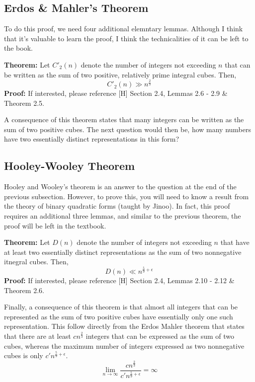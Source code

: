 \documentclass[8pt]{extarticle}
\begin{document}
\subsection{Erdos \& Mahler's Theorem}
To do this proof, we need four additional elemntary lemmas. Although I think that it's valuable to learn the proof, I think the technicalities of it can be left to the book.
\begin{boxedsection}
\textbf{Theorem:} Let $C'_2(n)$ denote the number of integers not exceeding $n$ that can be written as the sum of two positive, relatively prime integral cubes. Then, 
$$
C'_2(n) \gg n^{\frac{2}{3}}
$$
\textbf{Proof:} If interested, please reference [H] Section 2.4, Lemmas 2.6 - 2.9 \& Theorem 2.5.
\end{boxedsection}
A consequence of this theorem states that many integers can be written as the sum of two positive cubes. The next question would then be, how many numbers have two essentially distinct representations in this form?
\subsection{Hooley-Wooley Theorem}
Hooley and Wooley's theorem is an answer to the question at the end of the previous subsection. However, to prove this, you will need to know a result from the theory of binary quadratic forms (taught by Jinoo). In fact, this proof requires an additional three lemmas, and similar to the previous theorem, the proof will be left in the textbook.
\begin{boxedsection}
    \textbf{Theorem:} Let $D(n)$ denote the number of integers not exceeding $n$ that have at least two essentially distinct representations as the sum of two nonnegative itnegral cubes. Then,
    $$
    D(n) \ll n^{\frac{5}{9} + \epsilon}
    $$
    \textbf{Proof:} If interested, please reference [H] Section 2.4, Lemmas 2.10 - 2.12 \& Theorem 2.6.
\end{boxedsection}
Finally, a consequence of this theorem is that almost all integers that can be represented as the sum of two positive cubes have essentially only one such representation. This follow directly from the Erdos Mahler theorem that states that there are at least $cn^{\frac{2}{3}}$ integers that can be expressed as the sum of two cubes, whereas the maximum number of integers expressed as two nonnegative cubes is only $c'n^{\frac{5}{9} + \epsilon}$.
$$
\lim_{n\rightarrow\infty} \frac{cn^{\frac{2}{3}}}{c'n^{\frac{5}{9} + \epsilon}} = \infty
$$
\end{document}
